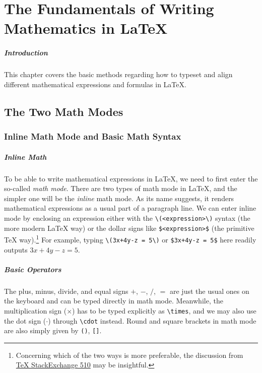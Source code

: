 \chapter{The Fundamentals of Writing Mathematics in \LaTeX{}}
\label{chap:maths}

\paragraph{Introduction}
This chapter covers the basic methods regarding how to typeset and align different mathematical expressions and formulas in \LaTeX{}.

\section{The Two Math Modes}

\subsection{Inline Math Mode and Basic Math Syntax}

\paragraph{Inline Math}
To be able to write mathematical expressions in \LaTeX{}, we need to first enter the so-called \textit{math mode}. There are two types of math mode in \LaTeX{}, and the simpler one will be the \textit{inline} math mode. As its name suggests, it renders mathematical expressions as a usual part of a paragraph line. We can enter inline mode by enclosing an expression either with the \texttt{\textbackslash(<expression>\textbackslash)}\index{\texttt{\textbackslash(\textbackslash)}} syntax (the more modern \LaTeX{} way) or the dollar signs like \texttt{\$<expression>\$}\index{\texttt{\$\$}} (the primitive \TeX{} way).\footnote{Concerning which of the two ways is more preferable, the discussion from \href{https://tex.stackexchange.com/questions/510/are-and-preferable-to-dollar-signs-for-math-mode/}{\TeX{} StackExchange 510} may be insightful.} For example, typing \texttt{\textbackslash(3x+4y-z = 5\textbackslash)} or \texttt{\$3x+4y-z = 5\$} here readily outputs \(3x+4y-z = 5\).

\paragraph{Basic Operators}
The plus, minus, divide, and equal signs $+$, $-$, $/$, $=$ are just the usual ones on the keyboard and can be typed directly in math mode. Meanwhile, the multiplication sign ($\times$) has to be typed explicitly as \texttt{\textbackslash times}, and we may also use the dot sign ($\cdot$) through \texttt{\textbackslash cdot} instead. Round and square brackets in math mode are also simply given by \texttt{()}, \texttt{[]}.

